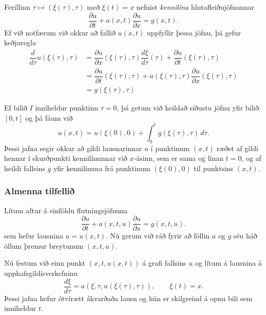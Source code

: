 \documentclass[icelandic,a4paper,12pt]{article}
\begin{document}
Ferillinn  $\tau\mapsto (\xi(\tau), \tau)$ með $\xi(t)=x$ nefnist
{\it kennilína} hlutafleiðujöfnunnar
$$
\dfrac{\partial u}{\partial t}
+a(x,t)\dfrac{\partial u}{\partial x}=g(x,t).
$$
Ef við  notfærum við okkur að fallið $u(x,t)$ uppfyllir
þessa jöfnu, þá gefur keðjuregla 
\begin{align*}
\dfrac {d}{d\tau} u(\xi(\tau),\tau)&= 
\dfrac{\partial u}{\partial x}(\xi(\tau),\tau) 
\dfrac{d\xi}{d\tau}(\tau)+
\dfrac{\partial u}{\partial t}(\xi(\tau),\tau)\\
&=\dfrac{\partial u}{\partial t}(\xi(\tau),\tau)
+a(\xi(\tau),\tau)
\dfrac{\partial u}{\partial x}(\xi(\tau),\tau) \\
&=g(\xi(\tau),\tau)  
\end{align*}



Ef bilið $I$ inniheldur punktinn $\tau=0$, þá getum við heildað
síðustu jöfnu yfir bilið $[0,t]$ og þá fáum við 
$$
u(x,t)=u(\xi(0),0)+\int_0^tg(\xi(\tau),\tau)\, d\tau.
$$
Þessi jafna segir okkur að gildi lausnarinnar $u$ í punktinum $(x,t)$
ræðst af gildi hennar í skurðpunkti kennilínunnar við $x$-ásinn, sem
er sama og línan $t=0$, og af heildi fallsins  $g$ yfir kennilínuna
frá punktinum $(\xi(0),0)$ til punktsins $(x,t)$.



\subsubsection{Almenna tilfellið} 
Lítum aftur á einföldu flutningsjöfnuna 
$$
\dfrac{\partial u}{\partial t}
+a(x,t,u)\dfrac{\partial u}{\partial x}=g(x,t,u).
$$
sem hefur lausnina $u=u(x,t)$.  Nú gerum við ráð fyrir 
að föllin $a$ og $g$ séu háð öllum þremur breytunum 
$(x,t,u)$. 

\smallskip
Nú festum við einn punkt $(x,t,u(x,t))$ á grafi fallsins 
$u$ og lítum á lausnina á upphafsgildisverkefninu
$$
  \dfrac{d\xi}{d\tau}=a(\xi,\tau,u(\xi(\tau),\tau)), \qquad \xi(t)=x.
$$
Þessi jafna hefur ótvírætt ákvarðaða lausn og hún er skilgreind 
á opnu bili sem inniheldur $t$.  
\end{document}
